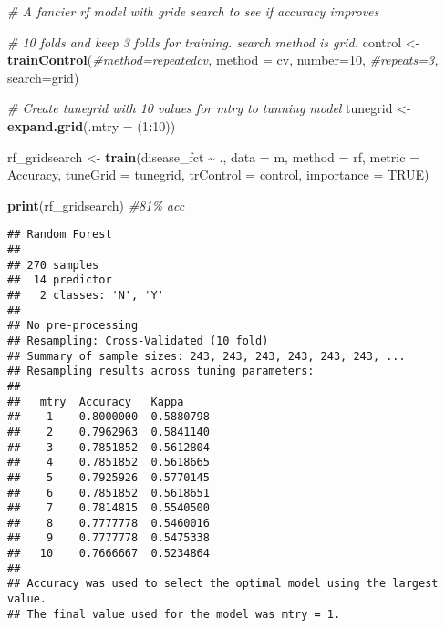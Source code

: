 \documentclass[
]{article}
\newenvironment{Shaded}{\begin{snugshade}}{\end{snugshade}}
\newcommand{\AttributeTok}[1]{\textcolor[rgb]{0.13,0.29,0.53}{#1}}
\newcommand{\CommentTok}[1]{\textcolor[rgb]{0.56,0.35,0.01}{\textit{#1}}}
\newcommand{\ConstantTok}[1]{\textcolor[rgb]{0.56,0.35,0.01}{#1}}
\newcommand{\DecValTok}[1]{\textcolor[rgb]{0.00,0.00,0.81}{#1}}
\newcommand{\FunctionTok}[1]{\textcolor[rgb]{0.13,0.29,0.53}{\textbf{#1}}}
\newcommand{\NormalTok}[1]{#1}
\newcommand{\OtherTok}[1]{\textcolor[rgb]{0.56,0.35,0.01}{#1}}
\newcommand{\SpecialCharTok}[1]{\textcolor[rgb]{0.81,0.36,0.00}{\textbf{#1}}}
\newcommand{\StringTok}[1]{\textcolor[rgb]{0.31,0.60,0.02}{#1}}
\begin{document}
\begin{Shaded}
\begin{Highlighting}[]
\CommentTok{\# A fancier rf model with gride search to see if accuracy improves}

\CommentTok{\# 10 folds and keep 3 folds for training. search method is grid.}
\NormalTok{control }\OtherTok{\textless{}{-}} \FunctionTok{trainControl}\NormalTok{(}\CommentTok{\#method=\textquotesingle{}repeatedcv\textquotesingle{}, }
                        \AttributeTok{method =} \StringTok{\textquotesingle{}cv\textquotesingle{}}\NormalTok{,}
                        \AttributeTok{number=}\DecValTok{10}\NormalTok{, }
                        \CommentTok{\#repeats=3, }
                        \AttributeTok{search=}\StringTok{\textquotesingle{}grid\textquotesingle{}}\NormalTok{)}

\CommentTok{\# Create tunegrid with 10 values for mtry to tunning model}
\NormalTok{tunegrid }\OtherTok{\textless{}{-}} \FunctionTok{expand.grid}\NormalTok{(}\AttributeTok{.mtry =}\NormalTok{ (}\DecValTok{1}\SpecialCharTok{:}\DecValTok{10}\NormalTok{)) }

\NormalTok{rf\_gridsearch }\OtherTok{\textless{}{-}} \FunctionTok{train}\NormalTok{(disease\_fct }\SpecialCharTok{\textasciitilde{}}\NormalTok{ ., }
                       \AttributeTok{data =}\NormalTok{ m,}
                       \AttributeTok{method =} \StringTok{\textquotesingle{}rf\textquotesingle{}}\NormalTok{,}
                       \AttributeTok{metric =} \StringTok{\textquotesingle{}Accuracy\textquotesingle{}}\NormalTok{,}
                       \AttributeTok{tuneGrid =}\NormalTok{ tunegrid,}
                       \AttributeTok{trControl =}\NormalTok{ control,}
                       \AttributeTok{importance =} \ConstantTok{TRUE}\NormalTok{)}

\FunctionTok{print}\NormalTok{(rf\_gridsearch) }\CommentTok{\#81\% acc}
\end{Highlighting}
\end{Shaded}

\begin{verbatim}
## Random Forest 
## 
## 270 samples
##  14 predictor
##   2 classes: 'N', 'Y' 
## 
## No pre-processing
## Resampling: Cross-Validated (10 fold) 
## Summary of sample sizes: 243, 243, 243, 243, 243, 243, ... 
## Resampling results across tuning parameters:
## 
##   mtry  Accuracy   Kappa    
##    1    0.8000000  0.5880798
##    2    0.7962963  0.5841140
##    3    0.7851852  0.5612804
##    4    0.7851852  0.5618665
##    5    0.7925926  0.5770145
##    6    0.7851852  0.5618651
##    7    0.7814815  0.5540500
##    8    0.7777778  0.5460016
##    9    0.7777778  0.5475338
##   10    0.7666667  0.5234864
## 
## Accuracy was used to select the optimal model using the largest value.
## The final value used for the model was mtry = 1.
\end{verbatim}
\end{document}
